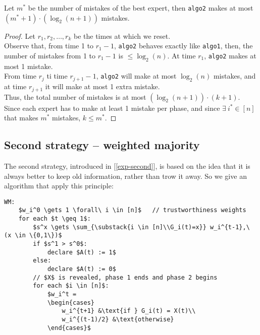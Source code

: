 \begin{lem}\label{lem:exp-algo2-errors}
    Let $m^*$ be the number of mistakes of the best expert, then \texttt{algo2} makes at most\\
    $(m^*+1)\cdot(\log_2(n+1))$ mistakes.
\end{lem}
\begin{proof}
    Let $r_1, r_2, \ldots, r_k$ be the times at which we reset.\\
    Observe that, from time 1 to $r_1-1$, \texttt{algo2} behaves exactly like \texttt{algo1}, then, the number of mistakes from 1 to $r_1-1$ is $\leq \log_2(n)$.
    At time $r_1$, \texttt{algo2} makes at most 1 mistake.\\
    From time $r_j$ ti time $r_{j+1}-1$, \texttt{algo2} will make at most $\log_2(n)$ mistakes, and at time $r_{j+1}$ it will make at most 1 extra mistake.\\
    Thus, the total number of mistakes is at most $(\log_2(n+1))\cdot(k+1)$.\\
    Since each expert has to make at least 1 mistake per phase, and since $\exists\ i^* \in [n]$ that makes $m^*$ mistakes, $k \leq m^*$.
\end{proof}


\subsection{Second strategy -- weighted majority} \label{sec:exp-weighted-maj}

The second strategy, introduced in [\ref{exp-second}], is based on the idea that it is always better to keep old information, rather than trow it away. So we give an algorithm that apply this principle:

\begin{lstlisting}[caption={Weighted Majority}, label={lst:exp-wm}]
WM:
    $w_i^0 \gets 1 \forall\ i \in [n]$   // trustworthiness weights
    for each $t \geq 1$:
        $s^x \gets \sum_{\substack{i \in [n]\\G_i(t)=x}} w_i^{t-1},\ (x \in \{0,1\})$
        if $s^1 > s^0$:
            declare $A(t) := 1$
        else:
            declare $A(t) := 0$
        // $X$ is revealed, phase 1 ends and phase 2 begins
        for each $i \in [n]$:
            $w_i^t = 
            \begin{cases}
                w_i^{t+1} &\text{if } G_i(t) = X(t)\\
                w_i^{(t-1)/2} &\text{otherwise}
            \end{cases}$
\end{lstlisting}


